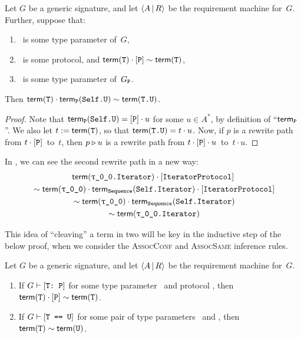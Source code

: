 \documentclass[../generics]{subfiles}
\begin{document}
\begin{lemma}\label{type param composition lemma}
Let $G$ be a generic signature, and let $\langle A\,|\,R\rangle$ be the requirement machine for~$G$. Further, suppose that:
\begin{enumerate}
\item \tT\ is some type parameter of~$G$,
\item \tP\ is some protocol, and $\mathsf{term}(\texttt{T})\cdot[\texttt{P}]\sim\mathsf{term}(\texttt{T})$,
\item \SelfU\ is some type parameter of~$G_{\texttt{P}}$. 
\end{enumerate}
Then $\mathsf{term}(\texttt{T})\cdot\mathsf{term}_{\texttt{P}}(\texttt{Self.U}) \sim \mathsf{term}(\texttt{T.U})$.
\end{lemma}
\begin{proof}
Note that $\mathsf{term}_{\texttt{P}}(\texttt{Self.U})=[\texttt{P}]\cdot u$ for some $u\in A^*$, by definition of ``$\mathsf{term}_{\texttt{P}}$''. We also let $t := \mathsf{term}(\texttt{T})$, so that $\mathsf{term}(\texttt{T.U})=t\cdot u$. Now, if $p$ is a rewrite path from $t\cdot[\texttt{P}]$~to~$t$, then $p\triangleright u$ is a rewrite path from $t\cdot[\texttt{P}]\cdot u$~to~$t\cdot u$.
\end{proof}

\begin{example}
In , we can see the second rewrite path in a new way:
\begin{gather*}
\Term(\texttt{\rT.Iterator})\cdot\pIterator\\
{} \sim \Term(\rT) \cdot \TermP{Sequence}(\texttt{Self.Iterator}) \cdot \pIterator\\
{} \sim \Term(\rT) \cdot \TermP{Sequence}(\texttt{Self.Iterator})\\
{} \sim \Term(\texttt{\rT.Iterator})
\end{gather*}
\end{example}

This idea of ``cleaving'' a term in two will be key in the inductive step of the below proof, when we consider the \textsc{AssocConf} and \textsc{AssocSame} inference rules.

\newcommand{\Path}{\mathsf{path}\,}

\begin{theorem}\label{derivation to path language}
Let $G$ be a generic signature, and let $\langle A\,|\,R\rangle$ be the requirement machine for~$G$.
\begin{enumerate}
\item If $G\vdash[\texttt{T:~P}]$ for some type parameter \tT\ and protocol \tP, then $\mathsf{term}(\texttt{T})\cdot[\texttt{P}] \sim \mathsf{term}(\texttt{T})$.
\item If $G\vdash[\texttt{T == U}]$ for some pair of type parameters \tT\ and \tU, then $\mathsf{term}(\texttt{T}) \sim \mathsf{term}(\texttt{U})$.
\end{enumerate}
\end{theorem}
\end{document}
